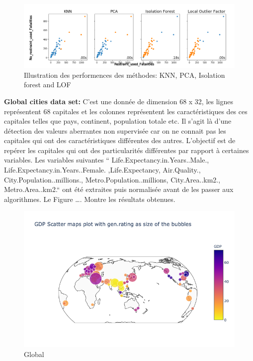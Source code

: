  \begin{figure}[h]
    \centering
    \includegraphics[width=1\textwidth]{ADOA/Images/fatalall.png}
    \caption{Illustration des performences des méthodes: KNN, PCA, Isolation forest and LOF}%
    \label{fig3}
\end{figure}
\vspace{2cm}

\textbf{Global cities data set:} 
 C’est une donnée de dimension 68 x 32, les lignes représentent  68 capitales  et les colonnes représentent les caractéristiques  des ces capitales telles que pays, continent, population totale etc.   Il s’agit là d’une détection des valeurs aberrantes non supervisée car on ne connait pas les capitales qui ont des caractéristiques différentes des autres. L’objectif est de repérer les capitales qui ont des particularités différentes par rapport à certaines variables. Les variables suivantes “ Life.Expectancy.in.Years..Male., Life.Expectancy.in.Years..Female. ,Life.Expectancy, Air.Quality., City.Population..millions., Metro.Population..millions, City.Area..km2., Metro.Area..km2.“ ont été extraites puis normalisée avant de les passer aux algorithmes. Le Figure …. Montre les résultats obtenues.
\begin{figure}[h]
    \centering
\includegraphics[width=1\textwidth]{ADOA/Images/Glob.png}
    \caption{Global}%
    \label{fig3}
\end{figure}

